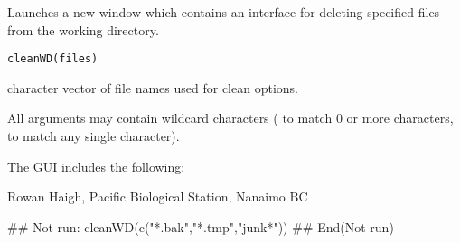 \documentclass[letterpaper]{book}
\begin{document}
\begin{Description}\relax
Launches a new window which contains an interface for deleting 
specified files from the working directory.
\end{Description}
\begin{Usage}
\begin{verbatim}
cleanWD(files)
\end{verbatim}
\end{Usage}
\begin{Arguments}
\begin{ldescription}
\item[\code{files}] character vector of file names used for clean options.
\end{ldescription}
\end{Arguments}
\begin{Details}\relax
All arguments may contain wildcard characters ( to match 0 or
more characters,  to match any single character).

The GUI includes the following:
\end{Details}
\begin{Author}\relax
Rowan Haigh, Pacific Biological Station, Nanaimo BC
\end{Author}
\begin{Examples}
\begin{ExampleCode}
## Not run: 
cleanWD(c("*.bak","*.tmp","junk*"))
## End(Not run)
\end{ExampleCode}
\end{Examples}
\end{document}
